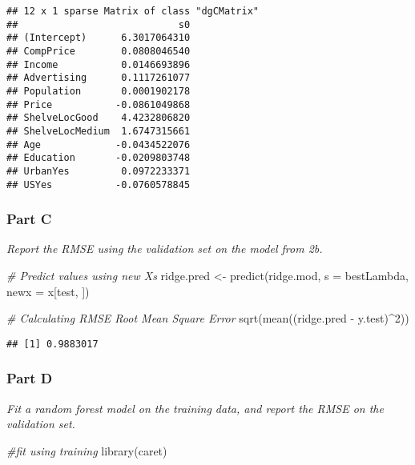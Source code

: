\documentclass[
]{article}
\newenvironment{Shaded}{\begin{snugshade}}{\end{snugshade}}
\newcommand{\AttributeTok}[1]{\textcolor[rgb]{0.77,0.63,0.00}{#1}}
\newcommand{\CommentTok}[1]{\textcolor[rgb]{0.56,0.35,0.01}{\textit{#1}}}
\newcommand{\DecValTok}[1]{\textcolor[rgb]{0.00,0.00,0.81}{#1}}
\newcommand{\FunctionTok}[1]{\textcolor[rgb]{0.00,0.00,0.00}{#1}}
\newcommand{\NormalTok}[1]{#1}
\newcommand{\OtherTok}[1]{\textcolor[rgb]{0.56,0.35,0.01}{#1}}
\newcommand{\SpecialCharTok}[1]{\textcolor[rgb]{0.00,0.00,0.00}{#1}}
\begin{document}
\begin{verbatim}
## 12 x 1 sparse Matrix of class "dgCMatrix"
##                            s0
## (Intercept)      6.3017064310
## CompPrice        0.0808046540
## Income           0.0146693896
## Advertising      0.1117261077
## Population       0.0001902178
## Price           -0.0861049868
## ShelveLocGood    4.4232806820
## ShelveLocMedium  1.6747315661
## Age             -0.0434522076
## Education       -0.0209803748
## UrbanYes         0.0972233371
## USYes           -0.0760578845
\end{verbatim}

\hypertarget{part-c-1}{%
\subsubsection{Part C}\label{part-c-1}}

\emph{Report the RMSE using the validation set on the model from 2b.}

\begin{Shaded}
\begin{Highlighting}[]
\CommentTok{\# Predict values using new X\textquotesingle{}s}
\NormalTok{ridge.pred }\OtherTok{\textless{}{-}} \FunctionTok{predict}\NormalTok{(ridge.mod, }\AttributeTok{s =}\NormalTok{ bestLambda, }\AttributeTok{newx =}\NormalTok{ x[test, ])}

\CommentTok{\# Calculating RMSE Root Mean Square Error}
\FunctionTok{sqrt}\NormalTok{(}\FunctionTok{mean}\NormalTok{((ridge.pred }\SpecialCharTok{{-}}\NormalTok{ y.test)}\SpecialCharTok{\^{}}\DecValTok{2}\NormalTok{))}
\end{Highlighting}
\end{Shaded}

\begin{verbatim}
## [1] 0.9883017
\end{verbatim}

\hypertarget{part-d}{%
\subsubsection{Part D}\label{part-d}}

\emph{Fit a random forest model on the training data, and report the
RMSE on the validation set.}

\begin{Shaded}
\begin{Highlighting}[]
\CommentTok{\#fit using training }
\FunctionTok{library}\NormalTok{(caret)}
\end{Highlighting}
\end{Shaded}
\end{document}
